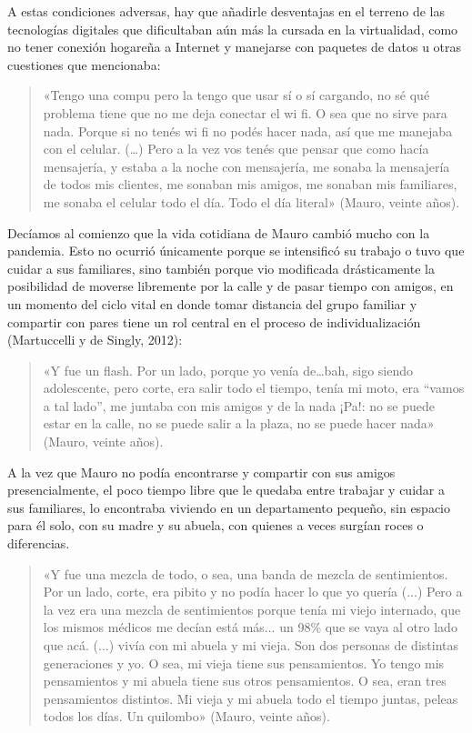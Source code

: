 A estas condiciones adversas, hay que añadirle desventajas en el terreno de las tecnologías digitales que dificultaban aún más la cursada en la virtualidad, como no tener conexión hogareña a Internet y manejarse con paquetes de datos u otras cuestiones que mencionaba:

\begin{quote}
«Tengo una compu pero la tengo que usar sí o sí cargando, no sé qué problema tiene que no me deja conectar el wi fi. O sea que no sirve para nada. Porque si no tenés wi fi no podés hacer nada, así que me manejaba con el celular. (\ldots) Pero a la vez vos tenés que pensar que como hacía mensajería, y estaba a la noche con mensajería, me sonaba la mensajería de todos mis clientes, me sonaban mis amigos, me sonaban mis familiares, me sonaba el celular todo el día. Todo el día literal» (Mauro, veinte años).
\end{quote}

Decíamos al comienzo que la vida cotidiana de Mauro cambió mucho con la pandemia. Esto no ocurrió únicamente porque se intensificó su trabajo o tuvo que cuidar a sus familiares, sino también porque vio modificada drásticamente la posibilidad de moverse libremente por la calle y de pasar tiempo con amigos, en un momento del ciclo vital en donde tomar distancia del grupo familiar y compartir con pares tiene un rol central en el proceso de individualización (Martuccelli y de Singly, 2012):

\begin{quote}
«Y fue un flash. Por un lado, porque yo venía de\ldots bah, sigo siendo adolescente, pero corte, era salir todo el tiempo, tenía mi moto, era ``vamos a tal lado'', me juntaba con mis amigos y de la nada ¡Pa!: no se puede estar en la calle, no se puede salir a la plaza, no se puede hacer nada» (Mauro, veinte años).
\end{quote}

A la vez que Mauro no podía encontrarse y compartir con sus amigos presencialmente, el poco tiempo libre que le quedaba entre trabajar y cuidar a sus familiares, lo encontraba viviendo en un departamento pequeño, sin espacio para él solo, con su madre y su abuela, con quienes a veces surgían roces o diferencias.

\begin{quote}
«Y fue una mezcla de todo, o sea, una banda de mezcla de sentimientos. Por un lado, corte, era pibito y no podía hacer lo que yo quería (...) Pero a la vez era una mezcla de sentimientos porque tenía mi viejo internado, que los mismos médicos me decían está más... un 98\% que se vaya al otro lado que acá. (...) vivía con mi abuela y mi vieja. Son dos personas de distintas generaciones y yo. O sea, mi vieja tiene sus pensamientos. Yo tengo mis pensamientos y mi abuela tiene sus otros pensamientos. O sea, eran tres pensamientos distintos. Mi vieja y mi abuela todo el tiempo juntas, peleas todos los días. Un quilombo» (Mauro, veinte años).
\end{quote}

